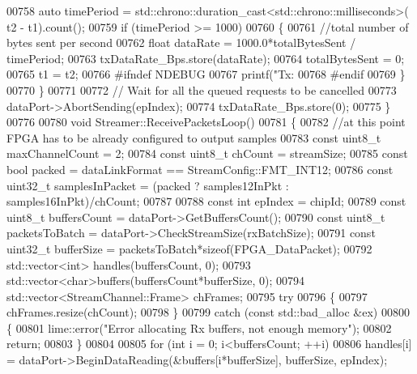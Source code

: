 \begin{DoxyCode}
{00758         \textcolor{keyword}{auto} timePeriod = std::chrono::duration\_cast<std::chrono::milliseconds>(
      t2 - t1).count();
00759         \textcolor{keywordflow}{if} (timePeriod >= 1000)
00760         \{
00761             \textcolor{comment}{//total number of bytes sent per second}
00762             \textcolor{keywordtype}{float} dataRate = 1000.0*totalBytesSent / timePeriod;
00763             txDataRate_Bps.store(dataRate);
00764             totalBytesSent = 0;
00765             t1 = t2;
00766 \textcolor{preprocessor}{#ifndef NDEBUG}
00767             printf(\textcolor{stringliteral}{"Tx: %
00768 \textcolor{preprocessor}{#endif}
00769         \}
00770     \}
00771 
00772     \textcolor{comment}{// Wait for all the queued requests to be cancelled}
00773     dataPort->AbortSending(epIndex);
00774     txDataRate_Bps.store(0);
00775 \}
00776 
00780 \textcolor{keywordtype}{void} Streamer::ReceivePacketsLoop()
00781 \{
00782     \textcolor{comment}{//at this point FPGA has to be already configured to output samples}
00783     \textcolor{keyword}{const} uint8\_t maxChannelCount = 2;
00784     \textcolor{keyword}{const} uint8\_t chCount = streamSize;
00785     \textcolor{keyword}{const} \textcolor{keywordtype}{bool} packed = dataLinkFormat == StreamConfig::FMT_INT12;
00786     \textcolor{keyword}{const} uint32\_t samplesInPacket = (packed  ? samples12InPkt : samples16InPkt)/chCount;
00787 
00788     \textcolor{keyword}{const} \textcolor{keywordtype}{int} epIndex = chipId;
00789     \textcolor{keyword}{const} uint8\_t buffersCount = dataPort->GetBuffersCount();
00790     \textcolor{keyword}{const} uint8\_t packetsToBatch = dataPort->CheckStreamSize(rxBatchSize);
00791     \textcolor{keyword}{const} uint32\_t bufferSize = packetsToBatch*\textcolor{keyword}{sizeof}(FPGA_DataPacket);
00792     std::vector<int> handles(buffersCount, 0);
00793     std::vector<char>buffers(buffersCount*bufferSize, 0);
00794     std::vector<StreamChannel::Frame> chFrames;
00795     \textcolor{keywordflow}{try}
00796     \{
00797         chFrames.resize(chCount);
00798     \}
00799     \textcolor{keywordflow}{catch} (\textcolor{keyword}{const} std::bad\_alloc &ex)
00800     \{
00801         lime::error(\textcolor{stringliteral}{"Error allocating Rx buffers, not enough memory"});
00802         \textcolor{keywordflow}{return};
00803     \}
00804 
00805     \textcolor{keywordflow}{for} (\textcolor{keywordtype}{int} i = 0; i<buffersCount; ++i)
00806         handles[i] = dataPort->BeginDataReading(&buffers[i*bufferSize], bufferSize, epIndex);
}}
\end{DoxyCode}
